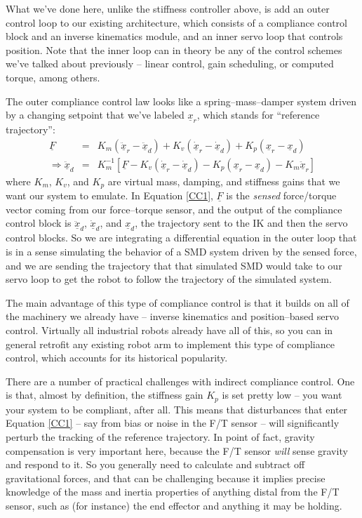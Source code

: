 \documentclass[]{article}
\begin{document}
What we've done here, unlike the stiffness controller above, is add an outer control loop to our existing architecture, which consists of a compliance control block and an inverse kinematics module, and an inner servo loop that controls position. Note that the inner loop can in theory be any of the control schemes we've talked about previously -- linear control, gain scheduling, or computed torque, among others.

The outer compliance control law looks like a spring--mass--damper system driven by a changing setpoint that we've labeled $\underline{x}_{r}$, which stands for ``reference trajectory'':
\begin{eqnarray}
 \underline{F} & = & K_{m}\left(\ddot{\underline{x}}_{r} - \ddot{\underline{x}}_{d}\right) + K_{v}\left(\underline{\dot{x}}_{r} - \underline{\dot{x}}_{d}\right) + K_{p}\left(\underline{x}_{r} - \underline{x}_{d}\right)  \nonumber \\
 \Rightarrow \ddot{\underline{x}}_{d} & = & K_{m}^{-1}\left[\underline{F} - K_{v}\left(\underline{\dot{x}}_{r} - \underline{\dot{x}}_{d}\right) - K_{p}\left(\underline{x}_{r}-\underline{x}_{d}\right) - K_{m}\underline{\ddot{x}}_{r}\right] \label{CC1}
 \end{eqnarray}
where $K_{m}$, $K_{v}$, and $K_{p}$ are virtual mass, damping, and stiffness gains that we want our system to emulate. In Equation \ref{CC1}, $\underline{F}$ is the \textit{sensed} force/torque vector coming from our force--torque sensor, and the output of the compliance control block is $\underline{\ddot{x}}_{d}$, $\underline{\dot{x}}_{d}$, and $\underline{x}_{d}$, the trajectory sent to the IK and then the servo control blocks. So we are integrating a differential equation in the outer loop that is in a sense simulating the behavior of a SMD system driven by the sensed force, and we are sending the trajectory that that simulated SMD would take to our servo loop to get the robot to follow the trajectory of the simulated system.

The main advantage of this type of compliance control is that it builds on all of the machinery we already have -- inverse kinematics and position--based servo control. Virtually all industrial robots already have all of this, so you can in general retrofit any existing robot arm to implement this type of compliance control, which accounts for its historical popularity.

There are a number of practical challenges with indirect compliance control. One is that, almost by definition, the stiffness gain $K_{p}$ is set pretty low -- you want your system to be compliant, after all. This means that disturbances that enter Equation \ref{CC1} -- say from bias or noise in the F/T sensor -- will significantly perturb the tracking of the reference trajectory. In point of fact, gravity compensation is very important here, because the F/T sensor \textit{will} sense gravity and respond to it. So you generally need to calculate and subtract off gravitational forces, and that can be challenging because it implies precise knowledge of the mass and inertia properties of anything distal from the F/T sensor, such as (for instance) the end effector and anything it may be holding.
\end{document}

